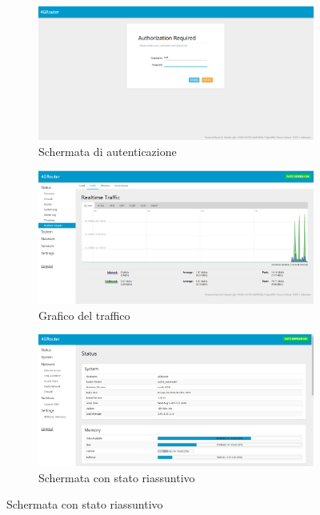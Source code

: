 \begin{figure}

	\newlength{\tempheight}
    \setlength{\tempheight}{23ex}

	\centering%
    \begin{subfigure}[t]{0.5\textwidth}
        \centering%
        \includegraphics[totalheight = \tempheight]{immagini/interfacciar4g_init.png}
        \caption{Schermata di autenticazione}
    \end{subfigure}%
	\hfill
    \begin{subfigure}[t]{0.5\textwidth}
        \centering%
        \includegraphics[totalheight = \tempheight]{immagini/interfacciar4g_traffic.png}
        \caption{Grafico del traffico}
    \end{subfigure}

	\vspace{1ex}

	\begin{subfigure}[b]{\textwidth}
        \centering%
        \includegraphics[totalheight = 1.6\tempheight]{immagini/interfacciar4g_status.png}
        \caption{Schermata con stato riassuntivo}
    \end{subfigure}

\end{figure}

